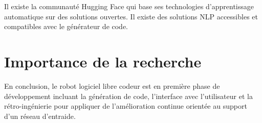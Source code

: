 Il existe la communauté Hugging Face qui base ses technologies d'apprentissage automatique sur des solutions ouvertes. Il existe des solutions NLP accessibles et compatibles avec le générateur de code.












\section{Importance de la recherche}
En conclusion, le robot logiciel libre codeur est en première phase de développement incluant la génération de code, l'interface avec l'utilisateur et la rétro-ingénierie pour appliquer de l'amélioration continue orientée au support d'un réseau d'entraide. 

